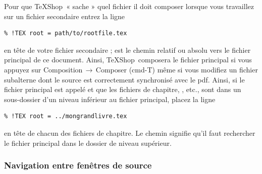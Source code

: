 \documentclass[11pt,french]{article}
\newcommand{\TS}{\textsf{\TeX Shop}}
\newcommand{\acr}[1]{\textsf{#1}}
\newcommand{\cmd}[1]{\textsf{#1}}
\newcommand{\mnu}[1]{\textsf{#1}}
\newcommand{\To}{\,\(\to\)\,}
\begin{document}
Pour que \TS\ « sache » quel fichier il doit composer lorsque vous travaillez sur un fichier secondaire entrez la ligne \begin{verbatim}
% !TEX root = path/to/rootfile.tex
\end{verbatim}
en tête de votre fichier secondaire ;  est le chemin relatif ou absolu vers le fichier principal de ce document. Ainsi, \TS\ composera le fichier principal si vous appuyez sur \mnu{Composition}\To\mnu{Composer} (\cmd{cmd-T}) même si vous modifiez un fichier subalterne dont le source est correctement synchronisé avec le \acr{pdf}. Ainsi, si le fichier principal est appelé  et que les fichiers de chapitre, , etc., sont dans un sous-dossier  d'un niveau inférieur au fichier principal, placez la ligne
\begin{verbatim}
% !TEX root = ../mongrandlivre.tex
\end{verbatim}
en tête de chacun des fichiers de chapitre. Le chemin  signifie qu'il faut rechercher le fichier principal dans le dossier de niveau supérieur.

%

\subsubsection{Navigation entre fenêtres de source} 
\end{document}
